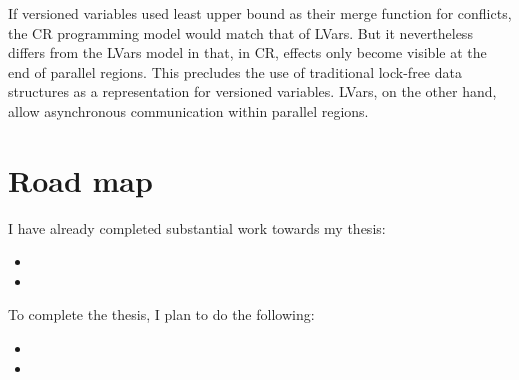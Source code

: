 \documentclass{article}
\begin{document}
If versioned variables used least upper bound as their merge function
for conflicts, the CR programming model would match that of LVars.    But it nevertheless
differs from the LVars model in that, in CR, effects only become
visible at the end of parallel regions. 
This precludes the use of traditional lock-free data structures as a
representation for versioned variables.  LVars, on the other hand,
allow asynchronous communication within parallel regions.

\section{Road map}

I have already completed substantial work towards my thesis:

\begin{itemize}
\item {}
\item {}
\end{itemize}
To complete the thesis, I plan to do the following:
\begin{itemize}
\item {}
\item {}
\end{itemize}



\end{document}
